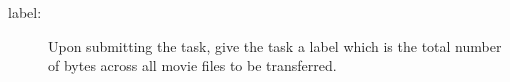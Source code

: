 


\begin{description}
    \item[label:] Upon submitting the task, give the task a label which is the total number 
                  of bytes across all movie files to be transferred.
\end{description}

